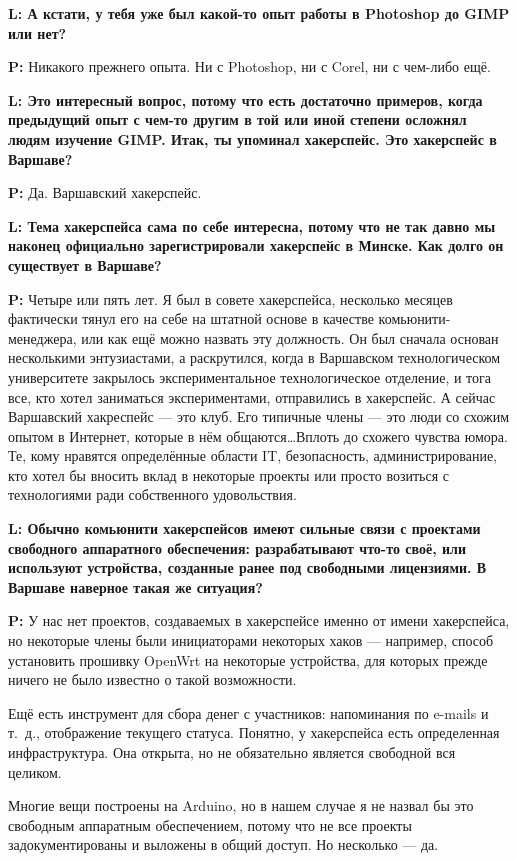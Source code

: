 \documentclass[10pt, a5paper]{article}
\begin{document}
\begin{Parallel}[p]{}{}
{{\noindent \bf L: А кстати, у тебя уже был какой-то опыт работы в Photoshop до GIMP или нет?}

{\noindent \bf P:}  Никакого прежнего опыта. Ни с Photoshop, ни с Corel, ни с чем-либо ещё.

{\noindent \bf L: Это интересный вопрос, потому что есть достаточно примеров, когда предыдущий опыт с чем-то другим в той или иной степени осложнял людям изучение GIMP. Итак, ты упоминал хакерспейс. Это хакерспейс в Варшаве?}

{\noindent \bf P:} Да. Варшавский хакерспейс. 

{\noindent \bf L: Тема хакерспейса сама по себе интересна, потому что не так давно мы наконец официально зарегистрировали хакерспейс в Минске. Как долго он существует в Варшаве?}

{\noindent \bf P:} Четыре или пять лет. Я был в совете хакерспейса, несколько  месяцев фактически тянул его на себе на штатной основе в качестве комьюнити-менеджера, или как ещё можно назвать эту должность. Он был сначала основан несколькими энтузиастами, а раскрутился, когда в Варшавском технологическом университете закрылось экспериментальное технологическое отделение, и тога все, кто хотел заниматься экспериментами, отправились в хакерспейс. А сейчас Варшавский хакреспейс --- это клуб. Его типичные члены --- это люди со схожим опытом в Интернет, которые в нём общаются\ldots Вплоть до схожего чувства юмора. Те, кому нравятся определённые области IT, безопасность, администрирование, кто хотел бы вносить вклад в некоторые проекты или просто возиться с технологиями ради собственного удовольствия.

{\noindent \bf L: Обычно комьюнити хакерспейсов имеют сильные связи с проектами свободного аппаратного обеспечения: разрабатывают что-то своё, или используют устройства, созданные ранее под свободными лицензиями. В Варшаве наверное такая же ситуация?}

{\noindent \bf P:} У нас нет проектов, создаваемых в хакерспейсе именно от имени хакерспейса, но некоторые члены были инициаторами некоторых хаков --- например, способ установить прошивку OpenWrt на некоторые устройства, для которых прежде ничего не было известно о такой возможности.

Ещё есть инструмент для сбора денег с участников: напоминания по e-mails и т.~д., отображение текущего статуса. Понятно, у хакерспейса есть определенная инфраструктура. Она открыта, но не обязательно является свободной вся целиком. 
 
Многие вещи построены на Arduino, но в нашем случае я не назвал бы это свободным аппаратным обеспечением, потому что не все проекты задокументированы и выложены в общий доступ. Но несколько --- да.

}
\end{Parallel}
\end{document}
